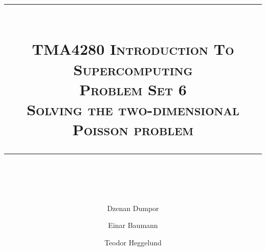




\author{Dzenan Dumpor \and Einar Baumann \and Teodor Heggelund}
\title{
    \vspace{-1in}
    \vspace{0.1in}
    \rule{\textwidth}{0.5pt} \\[0.5cm]
    \normalfont \normalsize \textsc{TMA4280 Introduction To Supercomputing} \\ [20pt]
    {\textsc{ \huge Problem Set 6 }} \\ [0.5cm]
    {\textsc {\Large Solving the two-dimensional Poisson problem} } \\
    \vspace{0.1in}
    \rule{\textwidth}{2pt} \\[0.7cm]
}


\maketitle
\thispagestyle{empty}
\clearpage














